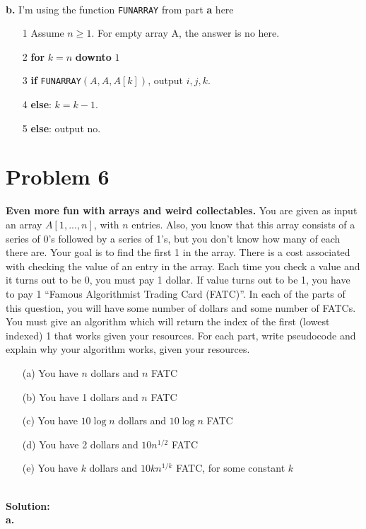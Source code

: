 \documentclass{article}
\theoremstyle{plain}
\begin{document}
\textbf{\\b.} I'm using the function \texttt{FUNARRAY} from part \textbf{a} here
\begin{enumerate}
    \item[1] Assume $n \geq 1$. For empty array A, the answer is no here.
    \item[2] \textbf{for} $k = n$ \textbf{downto} $1$
    \item[3] \quad \quad \textbf{if} \texttt{FUNARRAY}$(A, A, A[k])$, output $i, j, k$.
    \item[4] \quad \quad \textbf{else}: $k = k - 1$.
    \item[5] \textbf{else}: output no.
\end{enumerate}

\section*{Problem 6}
\textbf{Even more fun with arrays and weird collectables.} You are given as input an array $A[1, . . . , n]$, with $n$ entries. Also, you know that this array consists of a series of 0’s followed by a series of 1’s, but you don’t know how many of each there are. Your goal is to find the first 1 in the array. There is a cost associated with checking
the value of an entry in the array. Each time you check a value and it turns out to be 0, you must pay 1 dollar. If value turns out to be 1, you have to pay 1 “Famous Algorithmist Trading Card (FATC)”. In each of the parts of this question, you will have some number of dollars and some number of FATCs. You must give an algorithm which will return the index of the first (lowest indexed) 1 that works given your resources. For each part, write pseudocode and explain why your algorithm works, given your resources.
\begin{enumerate}
    \item[(a)] You have $n$ dollars and $n$ FATC
    \item[(b)] You have 1 dollars and $n$ FATC
    \item[(c)] You have $10 \log n$ dollars and $10 \log n$ FATC
    \item[(d)] You have 2 dollars and $10n^{1/2}$ FATC
    \item[(e)] You have $k$ dollars and $10kn^{1/k}$ FATC, for some constant $k$
\end{enumerate}
\textbf{\\Solution:\\}
\textbf{a.\\} 
\end{document}
